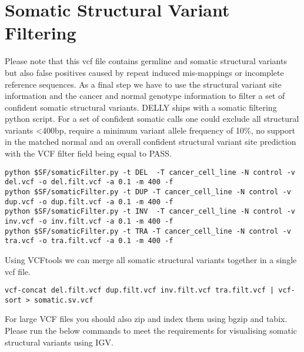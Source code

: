 \section{Somatic Structural Variant Filtering}

\begin{information}
Please note that this vcf file contains germline and somatic structural variants but also false positives caused by repeat induced mis-mappings or incomplete reference sequences. As a final step we have to use the structural variant site information and the cancer and normal genotype information to filter a set of confident somatic structural variants. DELLY ships with a somatic filtering python script. For a set of confident somatic calls one could exclude all structural variants \textless400bp, require a minimum variant allele frequency of 10\%, no support in the matched normal and an overall confident structural variant site prediction with the VCF filter field being equal to PASS.

\end{information}
\begin{steps}
\begin{lstlisting}
python $SF/somaticFilter.py -t DEL  -T cancer_cell_line -N control -v del.vcf -o del.filt.vcf -a 0.1 -m 400 -f
python $SF/somaticFilter.py -t DUP -T cancer_cell_line -N control -v dup.vcf -o dup.filt.vcf -a 0.1 -m 400 -f
python $SF/somaticFilter.py -t INV  -T cancer_cell_line -N control -v inv.vcf -o inv.filt.vcf -a 0.1 -m 400 -f
python $SF/somaticFilter.py -t TRA -T cancer_cell_line -N control -v tra.vcf -o tra.filt.vcf -a 0.1 -m 400 -f
\end{lstlisting}
\end{steps}


\begin{steps}
Using VCFtools we can merge all somatic structural variants together in a single vcf file.
\begin{lstlisting}
vcf-concat del.filt.vcf dup.filt.vcf inv.filt.vcf tra.filt.vcf | vcf-sort > somatic.sv.vcf
\end{lstlisting}
\end{steps}

\begin{information}
For large VCF files you should also zip and index them using bgzip and tabix. Please run the below commands to meet the requirements for visualising somatic structural variants using IGV.  
\end{information}

